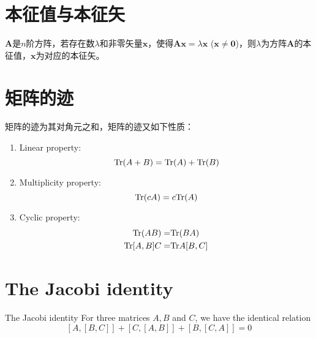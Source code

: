 \section{本征值与本征矢}

\begin{definition}[本征值与本征矢]
  $\bm{A}$是$n$阶方阵，若存在数$\lambda$和非零矢量$\bm{x}$，使得$\bm{Ax}=\lambda \bm{x}$ ($\bm{x}\neq \bm{0}$)，则$\lambda$为方阵$\bm{A}$的本征值，$\bm{x}$为对应的本征矢。
\end{definition}

\section{矩阵的迹}
矩阵的迹为其对角元之和，矩阵的迹又如下性质：
\begin{enumerate}
\item Linear property:
\begin{equation}
    {\rm Tr}(A+B) = {\rm Tr}(A) +{\rm Tr}(B)  \label{tracelinear}
\end{equation}

\item Multiplicity property:
\begin{equation}
    {\rm Tr}(cA) = c{\rm Tr}(A)  \label{tracemulti}
\end{equation}

\item Cyclic property:
\begin{equation}
  \begin{aligned}
    {\rm Tr}(AB) =& {\rm Tr}(BA)\\  \label{tracecyclic}
    {\rm Tr}[A,B]C =& {\rm Tr}A[B,C]
  \end{aligned}
\end{equation}
\end{enumerate}


\section{The Jacobi identity}
\begin{theorem}{The Jacobi identity}{}
  For three matrices $A, B$ and $C$, we have the identical relation
  \begin{equation}
    \left[A, [B,C]\right] + \left[C, [A,B]\right] + \left[B, [C,A]\right] = 0 \label{Jacobidentity}
  \end{equation}
\end{theorem}

